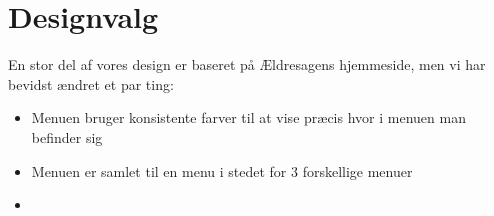 \section{Designvalg}
En stor del af vores design er baseret på Ældresagens hjemmeside, men vi har
bevidst ændret et par ting:

\begin{itemize}
\item Menuen bruger konsistente farver til at vise præcis hvor i menuen man befinder sig
\item Menuen er samlet til en menu i stedet for 3 forskellige menuer
\item 
\end{itemize}


